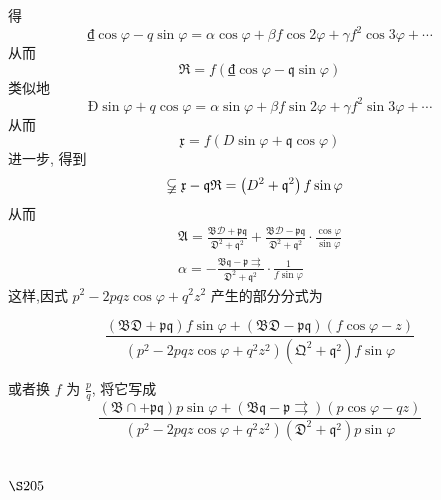 得
\[
₫ \cos \varphi-q \sin \varphi=\alpha \cos \varphi+\beta f \cos 2 \varphi+\gamma f^{2} \cos 3 \varphi+\cdots
\]
从而
\[
\mathfrak{R}=f(₫ \cos \varphi-\mathfrak{q} \sin \varphi)
\]
类似地
\[
Ð \sin \varphi+q \cos \varphi=\alpha \sin \varphi+\beta f \sin 2 \varphi+\gamma f^{2} \sin 3 \varphi+\cdots
\]
从而
\[
\mathfrak{x}=f(D \sin \varphi+\mathfrak{q} \cos \varphi)
\]
进一步, 得到
\[
\begin{aligned}
& \varsubsetneqq \mathfrak{x}-\mathfrak{q} \mathfrak{R}=\left(D^{2}+\mathfrak{q}^{2}\right) f \sin \varphi
\end{aligned}
\]
从而
\[
\begin{gathered}
\mathfrak{A}=\frac{\mathfrak{B} \mathscr{D}+\mathfrak{p q}}{\mathfrak{D}^{2}+\mathfrak{q}^{2}}+\frac{\mathfrak{B} \mathscr{D}-\mathfrak{p q}}{\mathfrak{D}^{2}+\mathfrak{q}^{2}} \cdot \frac{\cos \varphi}{\sin \varphi} \\
\alpha=-\frac{\mathfrak{B} \mathfrak{q}-\mathfrak{p} \rightrightarrows}{\mathfrak{D}^{2}+\mathfrak{q}^{2}} \cdot \frac{1}{f \sin \varphi}
\end{gathered}
\]
这样,因式 $p^{2}-2 p q z \cos \varphi+q^{2} z^{2}$ 产生的部分分式为

\[
\frac{(\mathfrak{BD}+\mathfrak{p q}) f \sin \varphi+(\mathfrak{BD}-\mathfrak{p q})(f \cos \varphi-z)}{\left(p^2-2 p q z \cos \varphi+q^2 z^2\right)\left(\mathfrak{Q}^2+\mathfrak{q}^2\right) f \sin \varphi}
\]

或者换 $f$ 为 $\frac{p}{q}$, 将它写成
\[
\frac{(\mathfrak{B} \cap+\mathfrak{p} \mathfrak{q}) p \sin \varphi+(\mathfrak{B} \mathfrak{q}-\mathfrak{p} \rightrightarrows)(p \cos \varphi-q z)}{\left(p^{2}-2 p q z \cos \varphi+q^{2} z^{2}\right)\left(\mathfrak{D}^{2}+\mathfrak{q}^{2}\right) p \sin \varphi}
\]
\section{$\S 205$}


